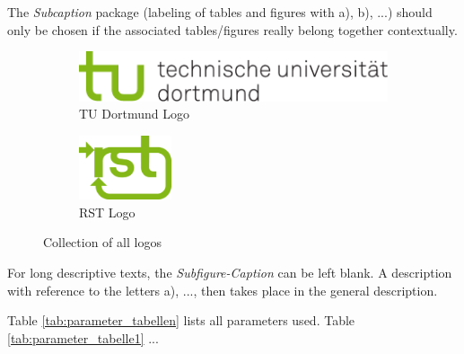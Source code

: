 The \textit{Subcaption} package (labeling of tables and figures with a), b), ...) should only be chosen if the associated tables/figures really belong together contextually.

\begin{figure}[htbp]
        \centering
        \begin{subfigure}[b]{0.3\textwidth}
        		\centering
                \includegraphics[width=\textwidth]{images/logos/tud_logo_rgb} 
                \caption{TU Dortmund Logo}
                \label{fig:subfigure_tud_logo}
        \end{subfigure}%
        \quad %
        \begin{subfigure}[b]{0.3\textwidth}
        		\centering
                \includegraphics[width=0.3\textwidth]{images/logos/rst_logo_rgb} %
                \caption{RST Logo}
                \label{fig:subfigure_rst_rgb}
        \end{subfigure}
        \caption{Collection of all logos}
        \label{fig:logos}
\end{figure}

For long descriptive texts, the \textit{Subfigure-Caption} can be left blank. A description with reference to the letters a), ..., then takes place in the general description.

Table \ref{tab:parameter_tabellen} lists all parameters used. Table \ref{tab:parameter_tabelle1} ...

